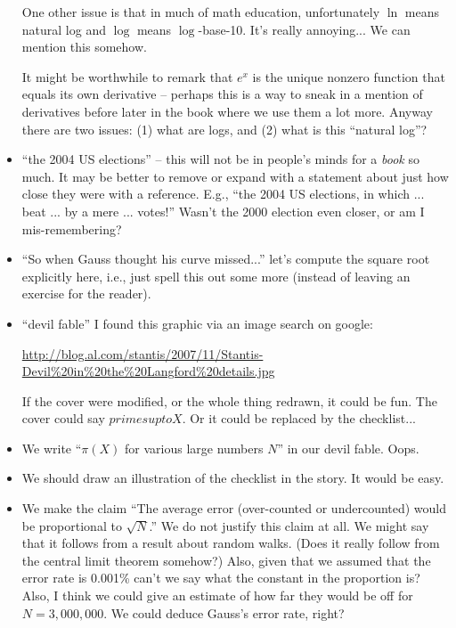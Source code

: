 \documentclass{article}
\begin{document}
\begin{itemize}
\begin{itemize}
\end{itemize}

One other issue is that in much of math education, unfortunately $\ln$
means natural log and $\log$ means $\log$-base-10.  It's really
annoying... We can mention this somehow. 

It might be worthwhile to remark that $e^x$ is the unique nonzero
function that equals its own derivative -- perhaps this is a way to
sneak in a mention of derivatives before later in the book where we
use them a lot more.  Anyway there are two issues: (1) what are logs,
and (2) what is this ``natural log''?

\item ``the 2004 US elections'' -- this will not be in people's minds
  for a {\em book} so much.  It may be better to remove or expand with
  a statement about just how close they were with a reference.  E.g.,
  ``the 2004 US elections, in which ... beat ... by a mere
  ... votes!''  Wasn't the 2000 election even closer, or am I
  mis-remembering?

\item ``So when Gauss thought his curve missed...''  let's compute the
  square root explicitly here, i.e., just spell this out some more
  (instead of leaving an exercise for the reader).

\item ``devil fable''  I found this graphic via an image search on google: 

\url{http://blog.al.com/stantis/2007/11/Stantis-Devil%20in%20the%20Langford%20details.jpg}

If the cover were modified, or the whole thing redrawn, it could be fun. The cover could say $primes up to X$.  Or it could be replaced by the checklist...

\item We write ``$\pi(X)$ for various large numbers $N$'' in our devil fable. Oops.

\item We should draw an illustration of the checklist in the story.
  It would be easy.

\item We make the claim ``The average error (over-counted or
  undercounted) would be proportional to $\sqrt{N}$.''  We do not
  justify this claim at all.  We might say that it follows from a
  result about random walks.  (Does it really follow from the central
  limit theorem somehow?)  Also, given that we assumed that the error
  rate is 0.001\% can't we say what the constant in the proportion is?
  Also, I think we could give an estimate of how far they would be off
  for $N=3,000,000$.  We could deduce Gauss's error rate, right?


\end{itemize}
\end{document}
